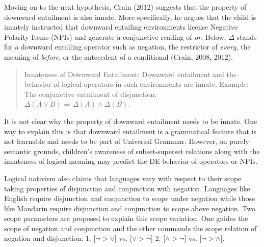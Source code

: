 \documentclass[oneside]{report}
\theoremstyle{definition}
\theoremstyle{definition}
\theoremstyle{definition}
\theoremstyle{remark}
\begin{document}
Moving on to the next hypothesis, Crain (2012) suggests that the
property of downward entailment is also innate. More specifically, he
argues that the child is innately instructed that downward entailing
environments license Negative Polarity Items (NPIs) and generate a
conjunctive reading of \emph{or}. Below, \(\Delta\) stands for a
downward entailing operator such as negation, the restrictor of
\emph{every}, the meaning of \emph{before}, or the antecedent of a
conditional (Crain, 2008, 2012).
\begin{quote}
Innateness of Downward Entailment: Downward entailment and the behavior
of logical operators in such environments are innate. Example; The
conjunctive entailment of disjunction:
\(\Delta (A \lor B) \Rightarrow \Delta (A) \land \Delta (B)\).
\end{quote}
It is not clear why the property of downward entailment needs to be
innate. One way to explain this is that downward entailment is a
grammatical feature that is not learnable and needs to be part of
Universal Grammar. However, on purely semantic grounds, children's
awareness of subset-superset relations along with the innateness of
logical meaning may predict the DE behavior of operators or NPIs.

Logical nativism also claims that languages vary with respect to their
scope taking properties of disjunction and conjunction with negation.
Languages like English require disjunction and conjunction to scope
under negation while those like Mandarin require disjunction and
conjunction to scope above negation. Two scope parameters are proposed
to explain this scope variation. One guides the scope of negation and
conjunction and the other commands the scope relation of negation and
disjunction: 1. {[}\(\lnot > \lor\){]} vs. {[}\(\lor > \lnot\){]} 2.
{[}\(\land > \lnot\){]} vs. {[}\(\lnot > \land\){]}.
\end{document}
